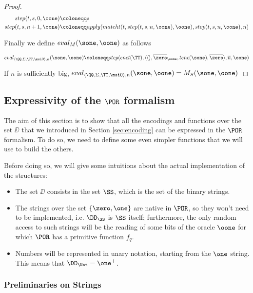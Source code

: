 \begin{proof}
\begin{align*}
step(t, s, 0, \oone)&\coloneqq s\\
step(t, s,n+1, \oone)&\coloneqq apply(matcht(t, step(t, s, n, \oone), \oone), step(t, s, n, \oone), n)\\
\end{align*}

Finally we define $eval_M(\sone, \oone)$ as follows

\[
eval_{\langle \QQ, \Sigma, \TT, \msi0 \rangle, n}(\sone, \oone)\coloneqq step(enct(\TT), \langle \langle\rangle, \overline \zero_\oone, tenc(\sone),\overline \zero \rangle, \overline n, \oone)
\]

If $n$ is sufficiently big, $eval_{\langle \QQ, \Sigma, \TT, \msi0 \rangle, n}(\sone, \oone)=M_S(\sone, \oone)$

\end{proof}

\subsection{Expressivity of the $\POR$ formalism}

The aim of this section is to show that all the encodings and functions over the set $\DD$ that we introduced in Section \ref{sec:encoding} can be expressed in the $\POR$ formalism. To do so, we need to define some even simpler functions that we will use to build the others.

Before doing so, we will give some intuitions about the actual implementation of the structures:

\begin{itemize}
\item The set $\DD$ consists in the set $\SS$, which is the set of the binary strings.
\item The strings over the set $\{\zero, \one\}$ are native in $\POR$, so they won't need to be implemented, i.e. $\DD_\SS$ is $\SS$ itself; furthermore, the only random access to such strings will be the reading of some bits of the oracle $\oone$ for which $\POR$ has a primitive function $f_q$.
\item Numbers will be represented in unary notation, starting from the $\one$ string. This means that $\DD_\Nat = \one^+$.
\end{itemize}

\subsubsection{Preliminaries on Strings}
\label{sec:strpre}

